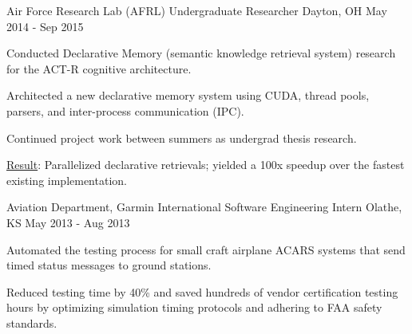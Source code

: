 \begin{cventries}
\cventry
{Air Force Research Lab (AFRL)}
{Undergraduate Researcher}
{Dayton, OH}
{May 2014 - Sep 2015}
{
\begin{cvitems}
\item Conducted Declarative Memory (semantic knowledge retrieval system) research for the ACT-R cognitive architecture.
\item Architected a new declarative memory system using CUDA, thread pools, parsers, and inter-process communication (IPC).
\item Continued project work between summers as undergrad thesis research.
\item \underline{Result}: Parallelized declarative retrievals; yielded a 100x speedup over the fastest existing implementation.
\end{cvitems}
}

\cventry
{Aviation Department, Garmin International}
{Software Engineering Intern}
{Olathe, KS}
{May 2013 - Aug 2013}
{
\begin{cvitems}
\item Automated the testing process for small craft airplane ACARS systems that send timed status messages to ground stations.
\item Reduced testing time by 40\% and saved hundreds of vendor certification testing hours by optimizing simulation timing protocols and adhering to FAA safety standards.
\end{cvitems}
}

\end{cventries}